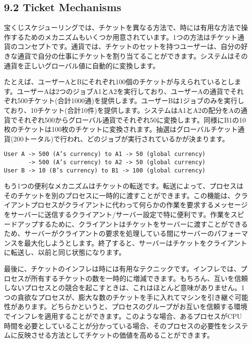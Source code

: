 \hypertarget{ticket-mechanisms}{%
\subsection*{9.2 Ticket Mechanisms}\label{ticket-mechanisms}}

宝くじスケジューリングでは、チケットを異なる方法で、時には有用な方法で操作するためのメカニズムもいくつか用意されています。1つの方法はチケット通貨のコンセプトです。通貨では、チケットのセットを持つユーザーは、自分の好きな通貨で自分の仕事にチケットを割り当てることができます。システムはその通貨を正しいグローバル値に自動的に変換します。

たとえば、ユーザーAとBにそれぞれ100個のチケットが与えられているとします。ユーザーAは2つのジョブA1とA2を実行しており、ユーザーAの通貨でそれぞれ500チケット(合計1000通)を提供します。ユーザーBは1ジョブのみを実行しており、10チケット(合計10件)を提供します。システムはA1とA2の配分をAの通貨でそれぞれ500からグローバル通貨でそれぞれ50に変換します。同様にB1の10枚のチケットは100枚のチケットに変換されます。抽選はグローバルチケット通貨(200トータル)で行われ、どのジョブが実行されているかが決まります。

\begin{verbatim}
User A -> 500 (A’s currency) to A1 -> 50 (global currency)  
       -> 500 (A’s currency) to A2 -> 50 (global currency)  
User B -> 10 (B’s currency) to B1 -> 100 (global currency)  
\end{verbatim}

もう1つの便利なメカニズムはチケットの転送です。転送によって、プロセスはそのチケットを別のプロセスに一時的に渡すことができます。この機能は、クライアントプロセスがクライアントに代わって何らかの作業を要求するメッセージをサーバーに送信するクライアント/サーバー設定で特に便利です。作業をスピードアップするために、クライアントはチケットをサーバーに渡すことができるため、サーバーがクライアントの要求を処理している間にサーバーのパフォーマンスを最大化しようとします。終了すると、サーバーはチケットをクライアントに転送し、以前と同じ状態になります。

最後に、チケットのインフレは時には有用なテクニックです。インフレでは、プロセスが所有するチケットの数を一時的に増減できます。もちろん、互いを信頼しないプロセスとの競合を起こすときは、これはほとんど意味がありません。1つの貪欲なプロセスが、膨大な数のチケットを手に入れてマシンを引き継ぐ可能性があります。どちらかというと、プロセスのグループがお互いを信頼する環境でインフレを適用することができます。このような場合、あるプロセスがCPU時間を必要としていることが分かっている場合、そのプロセスの必要性をシステムに反映させる方法としてチケットの価値を高めることができます。

